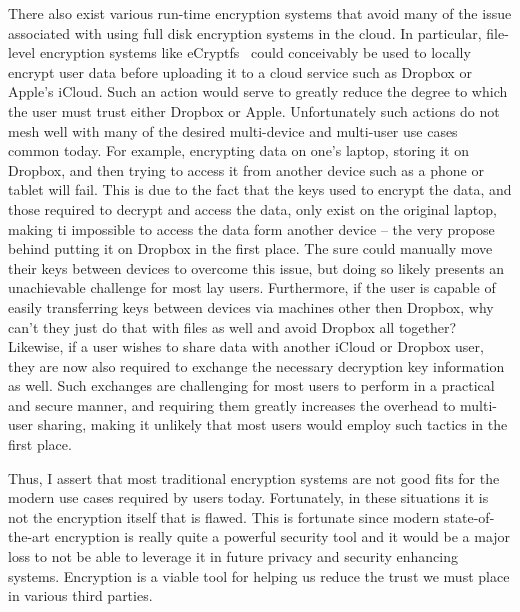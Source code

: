 There also exist various run-time encryption systems that avoid many
of the issue associated with using full disk encryption systems in the
cloud. In particular, file-level encryption systems like
eCryptfs~\cite{ecryptfs} could conceivably be used to locally encrypt
user data before uploading it to a cloud service such as Dropbox or
Apple's iCloud. Such an action would serve to greatly reduce the
degree to which the user must trust either Dropbox or
Apple. Unfortunately such actions do not mesh well with many of the
desired multi-device and multi-user use cases common today. For
example, encrypting data on one's laptop, storing it on Dropbox, and
then trying to access it from another device such as a phone or tablet
will fail. This is due to the fact that the keys used to encrypt the
data, and those required to decrypt and access the data, only exist on
the original laptop, making ti impossible to access the data form
another device -- the very propose behind putting it on Dropbox in the
first place. The sure could manually move their keys between devices
to overcome this issue, but doing so likely presents an unachievable
challenge for most lay users. Furthermore, if the user is capable of
easily transferring keys between devices via machines other then
Dropbox, why can't they just do that with files as well and avoid
Dropbox all together? Likewise, if a user wishes to share data with
another iCloud or Dropbox user, they are now also required to exchange
the necessary decryption key information as well. Such exchanges are
challenging for most users to perform in a practical and secure
manner, and requiring them greatly increases the overhead to
multi-user sharing, making it unlikely that most users would employ
such tactics in the first place.

Thus, I assert that most traditional encryption systems are not good
fits for the modern use cases required by users today. Fortunately, in
these situations it is not the encryption itself that is flawed. This
is fortunate since modern state-of-the-art encryption is really quite
a powerful security tool and it would be a major loss to not be able
to leverage it in future privacy and security enhancing
systems. Encryption is a viable tool for helping us reduce the trust
we must place in various third parties.


